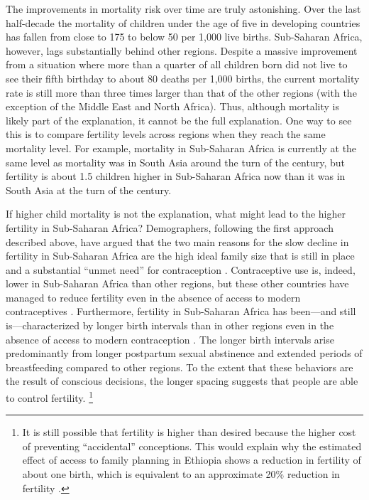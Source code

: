 \documentclass[letterpaper,12pt]{article}
\begin{document}
The improvements in mortality risk over time are truly astonishing. 
Over the last half-decade the mortality of children under the age of
five in developing countries has fallen from close to 175 to below 50
per 1,000 live births. 
Sub-Saharan Africa, however, lags substantially behind other regions. 
Despite a massive improvement from a situation where more than a quarter
of all children born did not live to see their fifth birthday to about
80 deaths per 1,000 births, the current mortality rate is still more
than three times larger than that of the other regions (with the
exception of the Middle East and North Africa). Thus, although mortality
is likely part of the explanation, it cannot be the full explanation. 
One way to see this is to compare fertility levels across regions when
they reach the same mortality level. 
For example, mortality in Sub-Saharan Africa is currently at the same
level as mortality was in South Asia around the turn of the century, but
fertility is about 1.5 children higher in Sub-Saharan Africa now than it
was in South Asia at the turn of the century.

If higher child mortality is not the explanation, what might lead to the
higher fertility in Sub-Saharan Africa? 
Demographers, following the first approach described above, have argued
that the two main reasons for the slow decline in fertility in
Sub-Saharan Africa are the high ideal family size that is still in place
and a substantial ``unmet need'' for contraception
\citep{Bongaarts2013a,Casterline2017,Singh2017}. 
Contraceptive use is, indeed, lower in Sub-Saharan Africa than other
regions, but these other countries have managed to reduce fertility even
in the absence of access to modern contraceptives
\citep{Schultz1985,Galloway1987,Bailey1998,bengtsson06}. 
Furthermore, fertility in Sub-Saharan Africa has been---and still
is---characterized by longer birth intervals than in other regions even
in the absence of access to modern contraception
\citep{Caldwell1992,Moultrie2012,Casterline2016}. 
The longer birth intervals arise predominantly from longer postpartum
sexual abstinence and extended periods of breastfeeding compared to
other regions. 
To the extent that these behaviors are the result of conscious
decisions, the longer spacing suggests that people are able to control
fertility.%
\footnote{
It is still possible that fertility is higher than desired because the
higher cost of preventing ``accidental'' conceptions. 
This would explain why the estimated effect of access to family planning
in Ethiopia shows a reduction in fertility of about one birth, which is
equivalent to an approximate 20\% reduction in fertility
\citep{Portner2014a}.}
\end{document}
